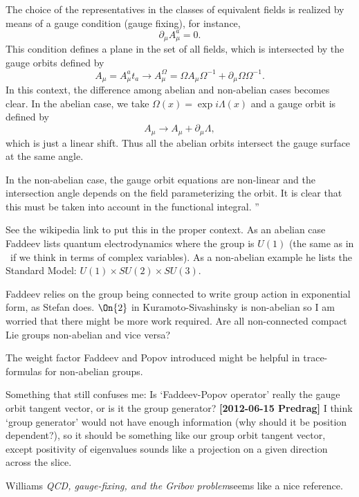 \begin{description}
The choice of the representatives in the classes of equivalent fields is
realized by means of a gauge condition (gauge fixing), for instance,
\[
    \partial_{\mu} A_{\mu}^{a} = 0 .
\]
This condition defines a plane in the set of all fields, which is
intersected by the gauge orbits defined by
\[
    A_{\mu} = A_{\mu}^{a}t_{a} \to A_{\mu}^{\Omega}
            = \Omega A_{\mu} \Omega^{-1} + \partial_{\mu} \Omega \Omega^{-1} .
\]
In this context, the difference among abelian and non-abelian cases
becomes clear. In the abelian case, we take $\Omega(x) =
\exp{i\Lambda(x)}$ and a gauge orbit is defined by
\[
    A_{\mu} \to A_{\mu} + \partial_{\mu} \Lambda ,
\]
which is just a linear shift. Thus all the abelian orbits intersect the
gauge surface at the same angle.

In the non-abelian case, the gauge orbit equations are non-linear and the
intersection angle depends on the field parameterizing the orbit. It is
clear that this must be taken into account in the functional integral.
'' %

See the wikipedia link to put this in the proper context. As an abelian
case Faddeev lists quantum electrodynamics where the group is $U(1)$ (the
same as in \cLe\ if we think in terms of complex variables). As a
non-abelian example he lists the Standard Model: $U(1)\times SU(2) \times
SU(3)$.

Faddeev relies on the group being connected to write group action in
exponential form, as Stefan does. $\On{2}$ in Kuramoto-Sivashinsky is
non-abelian so I am worried that there might be more work required. Are
all non-connected compact Lie groups non-abelian and vice versa?

The weight factor Faddeev and Popov introduced might be helpful in
trace-formulas for non-abelian groups.

\item[2012-06-15 Evangelos]
Something that still confuses me: Is `Faddeev-Popov operator' really the
gauge orbit tangent vector, or is it the group generator? {\bf
[2012-06-15 Predrag]} I think `group generator' would not have enough
information (why should it be position dependent?), so it should be
something like our group orbit tangent vector, except positivity of
eigenvalues sounds like a projection on a given direction across the
slice.

\item[2013-11-27  Predrag]
Williams {\em {QCD}, gauge-fixing, and the {Gribov}
problem}seems like a nice reference.


\end{description}
